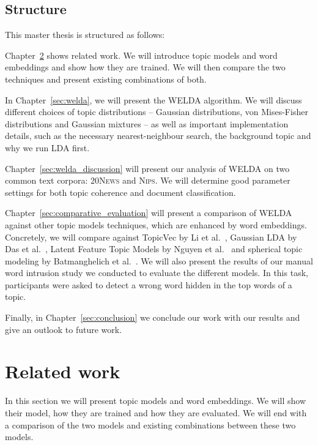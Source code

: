 \documentclass[
        a4paper,
        titlepage,
        twoside,
        parskip,
        numbers=noenddot
        ]{scrbook}
\theoremstyle{break}
\begin{document}
\section{Structure}
This master thesis is structured as follows:

\noindent Chapter~\ref{sec:related_work} shows related work.
We will introduce topic models and word embeddings and show how they are trained.
We will then compare the two techniques and present existing combinations of both.

\noindent In Chapter~\ref{sec:welda}, we will present the WELDA algorithm.
We will discuss different choices of topic distributions -- Gaussian distributions, von Mises-Fisher distributions and Gaussian mixtures -- as well as important implementation details, such as the necessary nearest-neighbour search, the background topic and why we run LDA first.

\noindent Chapter~\ref{sec:welda_discussion} will present our analysis of WELDA on two common text corpora: \textsc{20News} and \textsc{Nips}.
We will determine good parameter settings for both topic coherence and document classification.

\noindent Chapter~\ref{sec:comparative_evaluation} will present a comparison of WELDA against other topic models techniques, which are enhanced by word embeddings.
Concretely, we will compare against TopicVec by Li et al.~\cite{Li2016}, Gaussian LDA by Das et al.~\cite{Das2015}, Latent Feature Topic Models by Nguyen et al.~\cite{Nguyen2015} and spherical topic modeling by Batmanghelich et al.~\cite{Batmanghelich2016}.
We will also present the results of our manual word intrusion study we conducted to evaluate the different models.
In this task, participants were asked to detect a wrong word hidden in the top words of a topic.

\noindent Finally, in Chapter~\ref{sec:conclusion} we conclude our work with our results and give an outlook to future work.

\chapter{Related work}
\label{sec:related_work}
In this section we will present topic models and word embeddings.
We will show their model, how they are trained and how they are evaluated.
We will end with a comparison of the two models and existing combinations between these two models.
\end{document}
